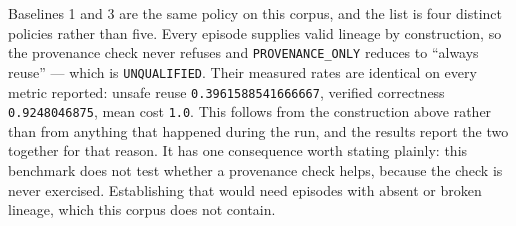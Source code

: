 Baselines 1 and 3 are the same policy on this corpus, and the list is
four distinct policies rather than five. Every episode supplies valid
lineage by construction, so the provenance check never refuses and
\texttt{PROVENANCE\_ONLY} reduces to ``always reuse'' --- which is
\texttt{UNQUALIFIED}. Their measured rates are identical on every metric
reported: unsafe reuse \texttt{0.3961588541666667}, verified correctness
\texttt{0.9248046875}, mean cost \texttt{1.0}. This follows from the
construction above rather than from anything that happened during the
run, and the results report the two together for that reason. It has one
consequence worth stating plainly: this benchmark does not test whether
a provenance check helps, because the check is never exercised.
Establishing that would need episodes with absent or broken lineage,
which this corpus does not contain.

